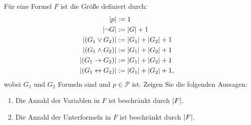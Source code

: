 \begin{exercise}
  \label{logic:formula-size}
  Für eine Formel $F$ ist die Größe  definiert durch:
  \begin{align*}
    \lvert p\rvert &:= 1 \\
    \lvert \lnot G\rvert &:= \lvert G\rvert + 1 \\
    \lvert (G_1 \vee G_2)\rvert &:= \lvert G_1\rvert + \lvert G_2\rvert + 1 \\
    \lvert (G_1 \wedge G_2)\rvert &:= \lvert G_1\rvert + \lvert G_2\rvert + 1 \\
    \lvert (G_1 \rightarrow G_2)\rvert & := \lvert G_1\rvert + \lvert G_2\rvert + 1 \\
    \lvert (G_1 \leftrightarrow G_2)\rvert & := \lvert G_1\rvert + \lvert G_2\rvert + 1,
  \end{align*}
  wobei $G_1$ und $G_2$ Formeln sind und $p \in {\mathcal{P}}$ ist.  Zeigen Sie
  die folgenden Aussagen:
  \begin{enumerate}[label={\alph*)}]
  \item Die Anzahl der Variablen in $F$ ist beschränkt durch $\lvert F\rvert$.
  \item Die Anzahl der Unterformeln in $F$ ist beschränkt durch $\lvert F\rvert$.
  \end{enumerate}
\end{exercise}

